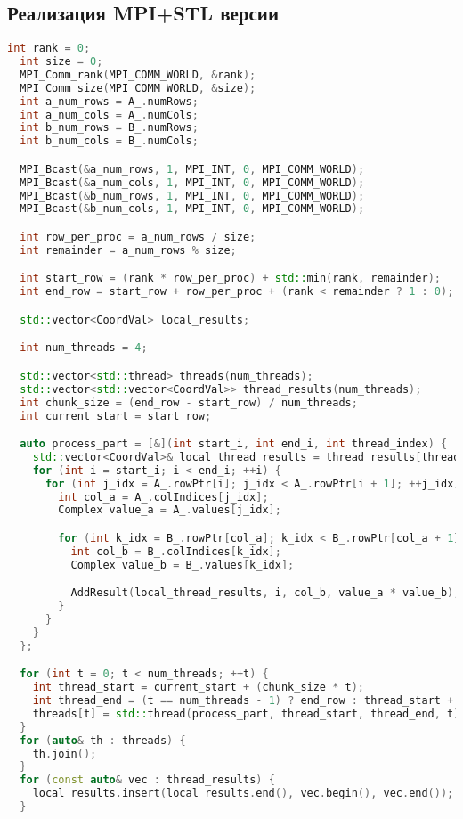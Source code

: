 \documentclass[14pt,a4paper]{extarticle}
\begin{document}
\subsection*{Реализация MPI+STL версии}
\begin{lstlisting}[language=C++]
  int rank = 0;
  int size = 0;
  MPI_Comm_rank(MPI_COMM_WORLD, &rank);
  MPI_Comm_size(MPI_COMM_WORLD, &size);
  int a_num_rows = A_.numRows;
  int a_num_cols = A_.numCols;
  int b_num_rows = B_.numRows;
  int b_num_cols = B_.numCols;

  MPI_Bcast(&a_num_rows, 1, MPI_INT, 0, MPI_COMM_WORLD);
  MPI_Bcast(&a_num_cols, 1, MPI_INT, 0, MPI_COMM_WORLD);
  MPI_Bcast(&b_num_rows, 1, MPI_INT, 0, MPI_COMM_WORLD);
  MPI_Bcast(&b_num_cols, 1, MPI_INT, 0, MPI_COMM_WORLD);

  int row_per_proc = a_num_rows / size;
  int remainder = a_num_rows % size;

  int start_row = (rank * row_per_proc) + std::min(rank, remainder);
  int end_row = start_row + row_per_proc + (rank < remainder ? 1 : 0);

  std::vector<CoordVal> local_results;

  int num_threads = 4;

  std::vector<std::thread> threads(num_threads);
  std::vector<std::vector<CoordVal>> thread_results(num_threads);
  int chunk_size = (end_row - start_row) / num_threads;
  int current_start = start_row;

  auto process_part = [&](int start_i, int end_i, int thread_index) {
    std::vector<CoordVal>& local_thread_results = thread_results[thread_index];
    for (int i = start_i; i < end_i; ++i) {
      for (int j_idx = A_.rowPtr[i]; j_idx < A_.rowPtr[i + 1]; ++j_idx) {
        int col_a = A_.colIndices[j_idx];
        Complex value_a = A_.values[j_idx];

        for (int k_idx = B_.rowPtr[col_a]; k_idx < B_.rowPtr[col_a + 1]; ++k_idx) {
          int col_b = B_.colIndices[k_idx];
          Complex value_b = B_.values[k_idx];

          AddResult(local_thread_results, i, col_b, value_a * value_b);
        }
      }
    }
  };

  for (int t = 0; t < num_threads; ++t) {
    int thread_start = current_start + (chunk_size * t);
    int thread_end = (t == num_threads - 1) ? end_row : thread_start + chunk_size;
    threads[t] = std::thread(process_part, thread_start, thread_end, t);
  }
  for (auto& th : threads) {
    th.join();
  }
  for (const auto& vec : thread_results) {
    local_results.insert(local_results.end(), vec.begin(), vec.end());
  }


\end{lstlisting}
\end{document}
